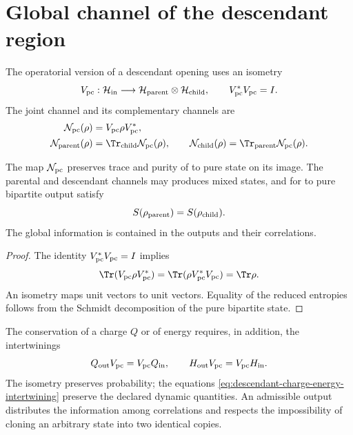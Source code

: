 \section{Global channel of the descendant region}

The operatorial version of a descendant opening uses an isometry
\begin{equation}
 V_{\rm pc}:\mathcal H_{\rm in}\longrightarrow
 \mathcal H_{\rm parent}\otimes\mathcal H_{\rm child},
 \qquad
 V_{\rm pc}^*V_{\rm pc}=I.
 \label{eq:descendant-parent-child-isometry}
\end{equation}
The joint channel and its complementary channels are
\begin{align}
 \mathcal N_{\rm pc}(\rho)
 &=V_{\rm pc}\rho V_{\rm pc}^*,
 \label{eq:descendant-global-channel}\\
 \mathcal N_{\rm parent}(\rho)
 &=\Tr_{\rm child}\mathcal N_{\rm pc}(\rho),
 \qquad
 \mathcal N_{\rm child}(\rho)
 =\Tr_{\rm parent}\mathcal N_{\rm pc}(\rho).
 \label{eq:descendant-complementary-channels}
\end{align}

\begin{theorem}
\label{thm:descendant-global-conservation}
The map \(\mathcal N_{\rm pc}\) preserves trace and purity of to pure state
on its image. The parental and descendant channels may produces
mixed states, and for to pure bipartite output satisfy
\begin{equation}
 S(\rho_{\rm parent})=S(\rho_{\rm child}).
 \label{eq:descendant-equal-entanglement}
\end{equation}
The global information is contained in the outputs and their correlations.
\end{theorem}

\begin{proof}
The identity \(V_{\rm pc}^*V_{\rm pc}=I\) implies
\[
 \Tr(V_{\rm pc}\rho V_{\rm pc}^*)
 =\Tr(\rho V_{\rm pc}^*V_{\rm pc})=\Tr\rho.
\]
An isometry maps unit vectors to unit vectors. Equality of the
reduced entropies follows from the Schmidt decomposition of the pure
bipartite state.
\end{proof}

The conservation of a charge \(Q\) or of energy requires, in addition,
the intertwinings
\begin{equation}
 Q_{\rm out}V_{\rm pc}=V_{\rm pc}Q_{\rm in},
 \qquad
 H_{\rm out}V_{\rm pc}=V_{\rm pc}H_{\rm in}.
 \label{eq:descendant-charge-energy-intertwining}
\end{equation}
The isometry preserves probability; the equations
\cref{eq:descendant-charge-energy-intertwining} preserve the declared dynamic
quantities. An admissible output distributes the information among
correlations and respects the impossibility of cloning an arbitrary state into
two identical copies.

